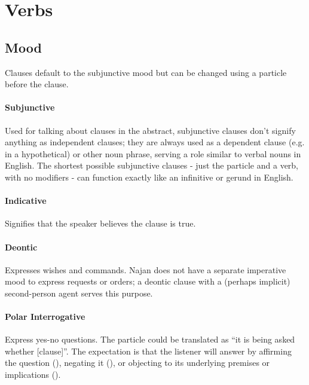 \section{Verbs} \label{sec:verbs}

\subsection{Mood} \label{sec:mood}

Clauses default to the subjunctive mood but can be changed using a particle
before the clause.

\paragraph{Subjunctive} Used for talking about clauses in the abstract,
subjunctive clauses don't signify anything as independent clauses; they are
always used as a dependent clause (e.g. in a hypothetical) or other noun phrase,
serving a role similar to verbal nouns in English. The shortest possible
subjunctive clauses - just the particle and a verb, with no modifiers - can
function exactly like an infinitive or gerund in English.

\paragraph{Indicative} Signifies that the speaker believes the clause is true.

\paragraph{Deontic} Expresses wishes and commands. Najan does not have a
separate imperative mood to express requests or orders; a deontic clause with a
(perhaps implicit) second-person agent serves this purpose.

\paragraph{Polar Interrogative} Express yes-no questions. The particle
 could be translated as ``it is being asked whether [clause]''. The
expectation is that the listener will answer by affirming the question
(), negating it (), or objecting to its underlying
premises or implications ().


